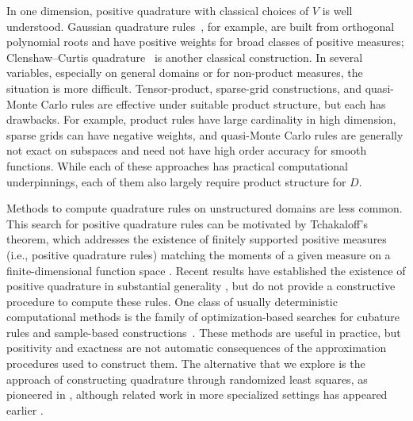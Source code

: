 \documentclass[10pt,dvipsnames]{amsart}
\begin{document}
In one dimension, positive quadrature with classical choices of $V$ is well understood.
Gaussian quadrature rules~\cite{Golub1969}, for example, are built from
orthogonal polynomial roots and have positive weights for broad classes of
positive measures; Clenshaw--Curtis quadrature~\cite{Clenshaw1960} is another
classical construction.  In several variables, especially on general domains
or for non-product measures, the situation is more difficult.
Tensor-product, sparse-grid constructions, and quasi-Monte Carlo rules 
\cite{Novak1999,Smolyak1963,Gerstner1998,dick_digital_2010,lemieux_monte_2009,niederreiter_random_1992}
are effective under suitable product structure, but each has drawbacks. For
example, product rules have large cardinality in high dimension, sparse grids
can have negative weights, and quasi-Monte Carlo rules are generally not exact
on subspaces and need not have high order accuracy for smooth functions. While
each of these approaches has practical computational underpinnings, each of
them also largely require product structure for $D$.

Methods to compute quadrature rules on unstructured domains are less common.
This search for positive quadrature rules can be motivated by Tchakaloff's
theorem, which addresses the existence of finitely supported positive measures
(i.e., positive quadrature rules) matching the moments of a given measure on a
finite-dimensional function space \cite{Tchakaloff1957,Davis1967,Bayer2006}.
Recent results have established the existence of positive quadrature in
substantial generality \cite{schafer_2025}, but do not provide a constructive
procedure to compute these rules.  One class of usually deterministic
computational methods is the family of optimization-based searches for cubature
rules \cite{Jakeman2017,Keshavarzzadeh2018,Keshavarzzadeh2018a} and
sample-based constructions~\cite{Bos2018b}.  These methods are useful in
practice, but positivity and exactness are not automatic consequences of the
approximation procedures used to construct them. The alternative that we
explore is the approach of constructing quadrature through randomized least
squares, as pioneered in \cite{migliorati2022stable}, although related work in
more specialized settings has appeared earlier \cite{Huybrechs2009,Wilson1970}.
\end{document}
